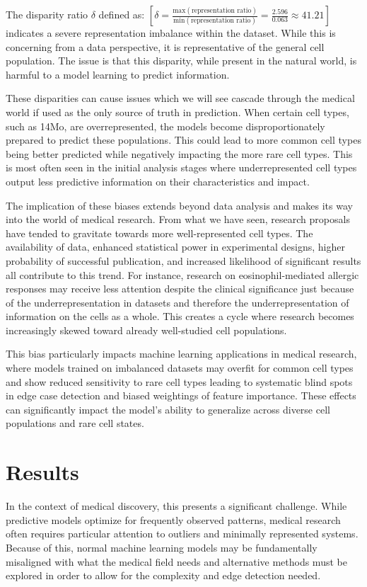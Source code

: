 \documentclass{article}
\begin{document}
The disparity ratio $\delta$ defined as:
$[\delta = \frac{\text{max}(\text{representation ratio})}{\text{min}(\text{representation ratio})} = \frac{2.596}{0.063} \approx 41.21]$
indicates a severe representation imbalance within the dataset. While this is concerning from a data perspective, it is representative of the general cell population. The issue is that this disparity, while present in the natural world, is harmful to a model learning to predict information.

These disparities can cause issues which we will see cascade through the medical world if used as the only source of truth in prediction. When certain cell types, such as 14Mo, are overrepresented, the models become disproportionately prepared to predict these populations. This could lead to more common cell types being better predicted while negatively impacting the more rare cell types. This is most often seen in the initial analysis stages where underrepresented cell types output less predictive information on their characteristics and impact.

The implication of these biases extends beyond data analysis and makes its way into the world of medical research. From what we have seen, research proposals have tended to gravitate towards more well-represented cell types. The availability of data, enhanced statistical power in experimental designs, higher probability of successful publication, and increased likelihood of significant results all contribute to this trend. For instance, research on eosinophil-mediated allergic responses may receive less attention despite the clinical significance just because of the underrepresentation in datasets and therefore the underrepresentation of information on the cells as a whole. This creates a cycle where research becomes increasingly skewed toward already well-studied cell populations.

This bias particularly impacts machine learning applications in medical research, where models trained on imbalanced datasets may overfit for common cell types and show reduced sensitivity to rare cell types leading to systematic blind spots in edge case detection and biased weightings of feature importance. These effects can significantly impact the model's ability to generalize across diverse cell populations and rare cell states.


\section{Results}
In the context of medical discovery, this presents a significant challenge. While predictive models optimize for frequently observed patterns, medical research often requires particular attention to outliers and minimally represented systems. Because of this, normal machine learning models may be fundamentally misaligned with what the medical field needs and alternative methods must be explored in order to allow for the complexity and edge detection needed.
\end{document}
